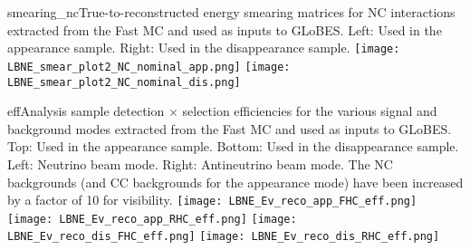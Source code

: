 

\begin{cdrfigure}{smearing_nc}{True-to-reconstructed energy smearing matrices for NC interactions extracted from the Fast MC and used as inputs to GLoBES.  Left: Used in the \nue appearance sample.  Right: Used in the \numu disappearance sample.}
 \texttt{[image: LBNE\_smear\_plot2\_NC\_nominal\_app.png]}
 \texttt{[image: LBNE\_smear\_plot2\_NC\_nominal\_dis.png]}
\end{cdrfigure}

\begin{cdrfigure}{eff}{Analysis sample detection $\times$ selection efficiencies for the various signal and background modes extracted from the Fast MC and used as inputs to GLoBES.  Top: Used in the \nue appearance sample. Bottom: Used in the \numu disappearance sample.  Left: Neutrino beam mode.  Right: Antineutrino beam mode.  The NC backgrounds (and \numu CC backgrounds for the appearance mode) have been increased by a factor of 10 for visibility.}
 \texttt{[image: LBNE\_Ev\_reco\_app\_FHC\_eff.png]}
 \texttt{[image: LBNE\_Ev\_reco\_app\_RHC\_eff.png]}
 \texttt{[image: LBNE\_Ev\_reco\_dis\_FHC\_eff.png]}
 \texttt{[image: LBNE\_Ev\_reco\_dis\_RHC\_eff.png]}
\end{cdrfigure}

